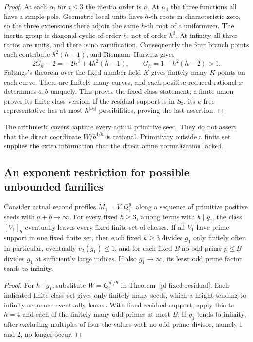 \begin{proof}
At each $\alpha_i$ for $i\le3$ the inertia order is $h$. At
$\alpha_4$ the three functions all have a simple pole. Geometric
local units have $h$-th roots in characteristic zero, so the three
extensions there adjoin the same $h$-th root of a uniformizer.
The inertia group is diagonal cyclic of order $h$, not of order
$h^3$. At infinity all three ratios are units, and there is no
ramification. Consequently the four branch points each contribute
$h^2(h-1)$, and Riemann--Hurwitz gives
\begin{equation}\label{pl-descent-genus}
 2G_h-2=-2h^3+4h^2(h-1),\qquad G_h=1+h^2(h-2)>1.
\end{equation}
Faltings's theorem over the fixed number field $K$ gives finitely many
$K$-points on each curve. There are finitely many curves, and each
positive reduced rational $x$ determines $a,b$ uniquely. This proves
the fixed-class statement; a finite union proves its finite-class
version. If the residual support is in $S_0$, its $h$-free
representative has at most $h^{|S_0|}$ possibilities, proving the
last assertion.
\end{proof}

The arithmetic covers capture every actual primitive seed. They do
not assert that the direct coordinate $W/b^{4/h}$ is rational.
Primitivity outside a finite set supplies the extra information that
the direct affine normalization lacked.

\subsection{An exponent restriction for possible unbounded families}

\begin{corollary}\label{pl-exponent-escape}
Consider actual second profiles $M_1=V_1Q_1^{g_1}$ along a sequence
of primitive positive seeds with $a+b\longrightarrow\infty$.
For every fixed $h\ge3$, among terms with $h\mid g_1$, the class
$[V_1]_h$ eventually leaves every fixed finite set of classes.
If all $V_1$ have prime support in one fixed finite set, then each
fixed $h\ge3$ divides $g_1$ only finitely often. In particular,
eventually $v_2(g_1)\le1$, and for each fixed $B$ no odd prime
$p\le B$ divides $g_1$ at sufficiently large indices. If also
$g_1\longrightarrow\infty$, its least odd prime factor tends to infinity.
\end{corollary}
\begin{proof}
For $h\mid g_1$, substitute $W=Q_1^{g_1/h}$ in
Theorem~\ref{pl-fixed-residual}. Each indicated finite class set gives
only finitely many seeds, which a height-tending-to-infinity sequence
eventually leaves. With fixed residual support, apply this to $h=4$
and each of the finitely many odd primes at most $B$. If $g_1$ tends
to infinity, after excluding multiples of four the values with no odd
prime divisor, namely $1$ and $2$, no longer occur.
\end{proof}

